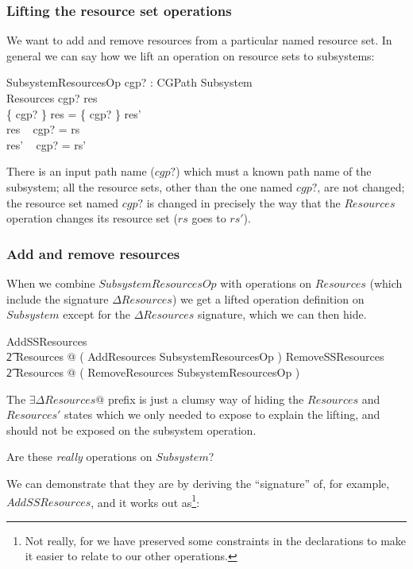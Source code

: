 \documentclass[a4paper,twoside,12pt]{article}
\begin{document}
\subsubsection{Lifting the resource set operations}
We want to add and remove resources from a particular named resource set. In general we can say
how we lift an operation on resource sets to subsystems:

\begin{schema}{SubsystemResourcesOp}
cgp? : CGPath
\also
\Delta Subsystem \\
\Delta Resources
\where
cgp? \in \dom res \\
\{ cgp? \} \ndres res = \{ cgp? \} \ndres res' \\
res ~ cgp? = rs \\
res' ~ cgp? = rs'
\end{schema}
There is an input path name ($cgp?$) which must a known path name of the subsystem;
all the resource sets, other than the one named $cgp?$, are not changed;
the resource set named $cgp?$ is changed in precisely the way that the $Resources$ operation changes
its resource set ($rs$ goes to $rs'$).

\subsubsection{Add and remove resources}
When we combine $SubsystemResourcesOp$ with operations on $Resources$ 
(which include the signature $\Delta Resources$)
we get a lifted operation definition on $Subsystem$ except for the $\Delta Resources$ signature, 
which we can then hide.

\begin{zed}
AddSSResources  \\
\t2 \exists \Delta Resources @ ( AddResources \land SubsystemResourcesOp )
\also
RemoveSSResources  \\
\t2 \exists \Delta Resources @ ( RemoveResources \land SubsystemResourcesOp )
\end{zed}
The $\exists \Delta Resources @$ prefix is just a clumsy way of hiding the $Resources$ and $Resources'$ states
which we only needed to expose to explain the lifting, and should not be exposed on the 
subsystem operation.

Are these \emph{really} operations on $Subsystem$?

We can demonstrate that they are by deriving the ``signature'' of, for example, $AddSSResources$, 
and it works out as\footnote{Not really,
for we have preserved some constraints in the declarations to make it easier to relate to our other operations.}:
\end{document}
